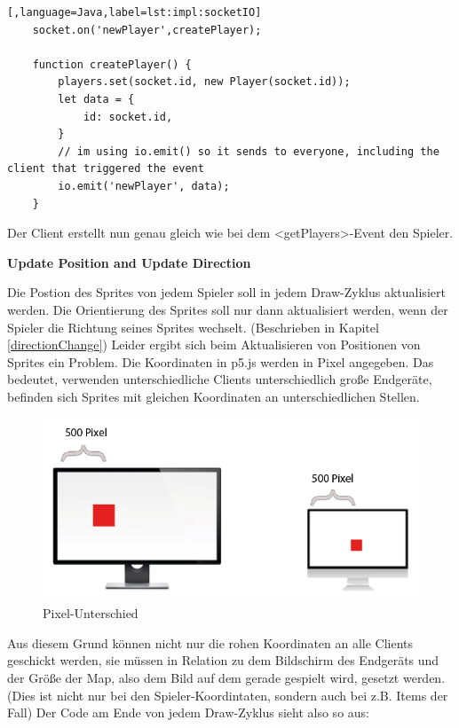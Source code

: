 \begin{lstlisting}[,language=Java,label=lst:impl:socketIO]
    socket.on('newPlayer',createPlayer);  

    function createPlayer() {
        players.set(socket.id, new Player(socket.id));
        let data = {
            id: socket.id,
        }
        // im using io.emit() so it sends to everyone, including the client that triggered the event
        io.emit('newPlayer', data);
    }
\end{lstlisting}

Der Client erstellt nun genau gleich wie bei dem <getPlayers>-Event den Spieler.

\textbf{Update Position and Update Direction}

Die Postion des Sprites von jedem Spieler soll in jedem Draw-Zyklus aktualisiert werden. Die Orientierung des Sprites soll nur dann aktualisiert werden, wenn der Spieler die Richtung seines Sprites wechselt. (Beschrieben in Kapitel \ref{directionChange})
Leider ergibt sich beim Aktualisieren von Positionen von Sprites ein Problem. Die Koordinaten in p5.js werden in Pixel angegeben. Das bedeutet, verwenden unterschiedliche Clients unterschiedlich große Endgeräte, befinden sich Sprites mit gleichen Koordinaten an unterschiedlichen Stellen.

\begin{figure}[H]
    \centering
    \includegraphics[scale=1]{pics/pixelDiff.PNG}
    \caption{Pixel-Unterschied}
\end{figure}

Aus diesem Grund können nicht nur die rohen Koordinaten an alle Clients geschickt werden, sie müssen in Relation zu dem Bildschirm des Endgeräts und der Größe der Map, also dem Bild auf dem gerade gespielt wird, gesetzt werden.
(Dies ist nicht nur bei den Spieler-Koordintaten, sondern auch bei z.B. Items der Fall)
Der Code am Ende von jedem Draw-Zyklus sieht also so aus:

